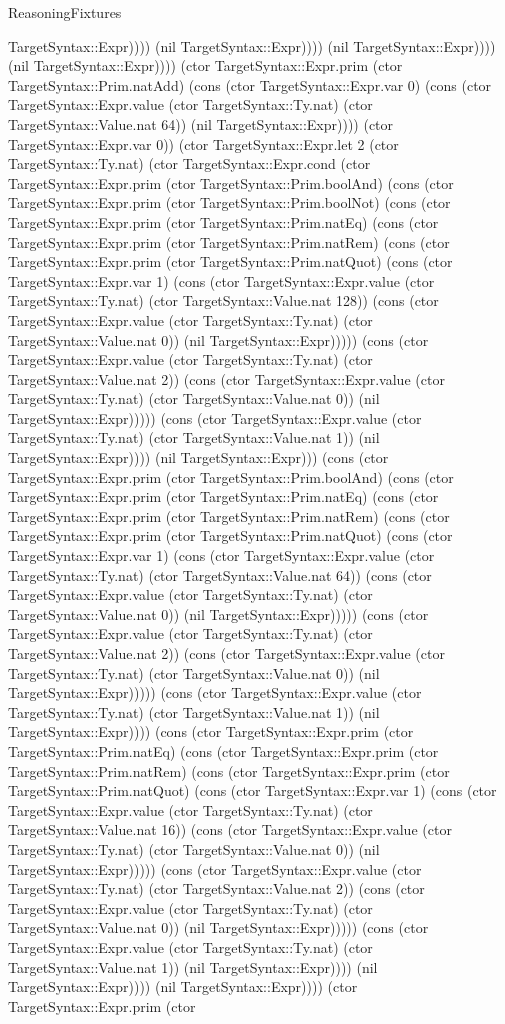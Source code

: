 \begin{lexlean}{ReasoningFixtures}
\begin{semanticmodule}
{TargetSyntax::Expr)))) (nil TargetSyntax::Expr)))) (nil TargetSyntax::Expr)))) (nil TargetSyntax::Expr)))) (ctor TargetSyntax::Expr.prim (ctor TargetSyntax::Prim.natAdd) (cons (ctor TargetSyntax::Expr.var 0) (cons (ctor TargetSyntax::Expr.value (ctor TargetSyntax::Ty.nat) (ctor TargetSyntax::Value.nat 64)) (nil TargetSyntax::Expr)))) (ctor TargetSyntax::Expr.var 0)) (ctor TargetSyntax::Expr.let 2 (ctor TargetSyntax::Ty.nat) (ctor TargetSyntax::Expr.cond (ctor TargetSyntax::Expr.prim (ctor TargetSyntax::Prim.boolAnd) (cons (ctor TargetSyntax::Expr.prim (ctor TargetSyntax::Prim.boolNot) (cons (ctor TargetSyntax::Expr.prim (ctor TargetSyntax::Prim.natEq) (cons (ctor TargetSyntax::Expr.prim (ctor TargetSyntax::Prim.natRem) (cons (ctor TargetSyntax::Expr.prim (ctor TargetSyntax::Prim.natQuot) (cons (ctor TargetSyntax::Expr.var 1) (cons (ctor TargetSyntax::Expr.value (ctor TargetSyntax::Ty.nat) (ctor TargetSyntax::Value.nat 128)) (cons (ctor TargetSyntax::Expr.value (ctor TargetSyntax::Ty.nat) (ctor TargetSyntax::Value.nat 0)) (nil TargetSyntax::Expr))))) (cons (ctor TargetSyntax::Expr.value (ctor TargetSyntax::Ty.nat) (ctor TargetSyntax::Value.nat 2)) (cons (ctor TargetSyntax::Expr.value (ctor TargetSyntax::Ty.nat) (ctor TargetSyntax::Value.nat 0)) (nil TargetSyntax::Expr))))) (cons (ctor TargetSyntax::Expr.value (ctor TargetSyntax::Ty.nat) (ctor TargetSyntax::Value.nat 1)) (nil TargetSyntax::Expr)))) (nil TargetSyntax::Expr))) (cons (ctor TargetSyntax::Expr.prim (ctor TargetSyntax::Prim.boolAnd) (cons (ctor TargetSyntax::Expr.prim (ctor TargetSyntax::Prim.natEq) (cons (ctor TargetSyntax::Expr.prim (ctor TargetSyntax::Prim.natRem) (cons (ctor TargetSyntax::Expr.prim (ctor TargetSyntax::Prim.natQuot) (cons (ctor TargetSyntax::Expr.var 1) (cons (ctor TargetSyntax::Expr.value (ctor TargetSyntax::Ty.nat) (ctor TargetSyntax::Value.nat 64)) (cons (ctor TargetSyntax::Expr.value (ctor TargetSyntax::Ty.nat) (ctor TargetSyntax::Value.nat 0)) (nil TargetSyntax::Expr))))) (cons (ctor TargetSyntax::Expr.value (ctor TargetSyntax::Ty.nat) (ctor TargetSyntax::Value.nat 2)) (cons (ctor TargetSyntax::Expr.value (ctor TargetSyntax::Ty.nat) (ctor TargetSyntax::Value.nat 0)) (nil TargetSyntax::Expr))))) (cons (ctor TargetSyntax::Expr.value (ctor TargetSyntax::Ty.nat) (ctor TargetSyntax::Value.nat 1)) (nil TargetSyntax::Expr)))) (cons (ctor TargetSyntax::Expr.prim (ctor TargetSyntax::Prim.natEq) (cons (ctor TargetSyntax::Expr.prim (ctor TargetSyntax::Prim.natRem) (cons (ctor TargetSyntax::Expr.prim (ctor TargetSyntax::Prim.natQuot) (cons (ctor TargetSyntax::Expr.var 1) (cons (ctor TargetSyntax::Expr.value (ctor TargetSyntax::Ty.nat) (ctor TargetSyntax::Value.nat 16)) (cons (ctor TargetSyntax::Expr.value (ctor TargetSyntax::Ty.nat) (ctor TargetSyntax::Value.nat 0)) (nil TargetSyntax::Expr))))) (cons (ctor TargetSyntax::Expr.value (ctor TargetSyntax::Ty.nat) (ctor TargetSyntax::Value.nat 2)) (cons (ctor TargetSyntax::Expr.value (ctor TargetSyntax::Ty.nat) (ctor TargetSyntax::Value.nat 0)) (nil TargetSyntax::Expr))))) (cons (ctor TargetSyntax::Expr.value (ctor TargetSyntax::Ty.nat) (ctor TargetSyntax::Value.nat 1)) (nil TargetSyntax::Expr)))) (nil TargetSyntax::Expr)))) (nil TargetSyntax::Expr)))) (ctor TargetSyntax::Expr.prim (ctor }
\end{semanticmodule}
\end{lexlean}
